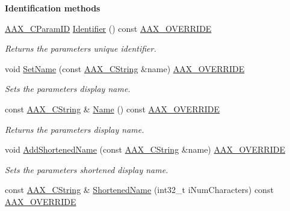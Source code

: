 \begin{Indent}\textbf{ Identification methods}\par
\begin{DoxyCompactItemize}
\item 
\mbox{\hyperlink{a00392_a1440c756fe5cb158b78193b2fc1780d1}{A\+A\+X\+\_\+\+C\+Param\+ID}} \mbox{\hyperlink{a01541_a9ab991e0bad2bc76b7efba3d129f1953}{Identifier}} () const \mbox{\hyperlink{a00392_ac2f24a5172689ae684344abdcce55463}{A\+A\+X\+\_\+\+O\+V\+E\+R\+R\+I\+DE}}
\begin{DoxyCompactList}\small\item\em Returns the parameter\textquotesingle{}s unique identifier. \end{DoxyCompactList}\item 
void \mbox{\hyperlink{a01541_ada71762c3254475a587047b50efbead5}{Set\+Name}} (const \mbox{\hyperlink{a01573}{A\+A\+X\+\_\+\+C\+String}} \&name) \mbox{\hyperlink{a00392_ac2f24a5172689ae684344abdcce55463}{A\+A\+X\+\_\+\+O\+V\+E\+R\+R\+I\+DE}}
\begin{DoxyCompactList}\small\item\em Sets the parameter\textquotesingle{}s display name. \end{DoxyCompactList}\item 
const \mbox{\hyperlink{a01573}{A\+A\+X\+\_\+\+C\+String}} \& \mbox{\hyperlink{a01541_a191fc266252f440feca3f3138e706cb8}{Name}} () const \mbox{\hyperlink{a00392_ac2f24a5172689ae684344abdcce55463}{A\+A\+X\+\_\+\+O\+V\+E\+R\+R\+I\+DE}}
\begin{DoxyCompactList}\small\item\em Returns the parameter\textquotesingle{}s display name. \end{DoxyCompactList}\item 
void \mbox{\hyperlink{a01541_a332e391a496d741f0f86ee7e46dbe6a4}{Add\+Shortened\+Name}} (const \mbox{\hyperlink{a01573}{A\+A\+X\+\_\+\+C\+String}} \&name) \mbox{\hyperlink{a00392_ac2f24a5172689ae684344abdcce55463}{A\+A\+X\+\_\+\+O\+V\+E\+R\+R\+I\+DE}}
\begin{DoxyCompactList}\small\item\em Sets the parameter\textquotesingle{}s shortened display name. \end{DoxyCompactList}\item 
const \mbox{\hyperlink{a01573}{A\+A\+X\+\_\+\+C\+String}} \& \mbox{\hyperlink{a01541_a2cf8f9e426e01d3eabea95447e856c23}{Shortened\+Name}} (int32\+\_\+t i\+Num\+Characters) const \mbox{\hyperlink{a00392_ac2f24a5172689ae684344abdcce55463}{A\+A\+X\+\_\+\+O\+V\+E\+R\+R\+I\+DE}}

\end{DoxyCompactItemize}
\end{Indent}
